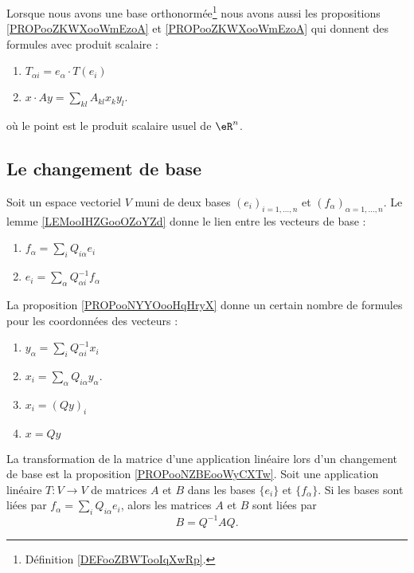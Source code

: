 Lorsque nous avons une base orthonormée\footnote{Définition \ref{DEFooZBWTooIqXwRp}.} nous avons aussi les propositions \ref{PROPooZKWXooWmEzoA} et \ref{PROPooZKWXooWmEzoA} qui donnent des formules avec produit scalaire :
\begin{enumerate}
	\item
	      \( T_{\alpha i}=e_{\alpha}\cdot T(e_i)\)
	\item
	      \( x\cdot Ay=\sum_{kl}A_{kl}x_ky_l\).
\end{enumerate}
où le point est le produit scalaire usuel de \( \eR^n\).

\subsection{Le changement de base}

Soit un espace vectoriel \( V\) muni de deux bases \( (e_i)_{i=1,\ldots, n}\) et \( (f_{\alpha})_{\alpha=1,\ldots, n}\). Le lemme \ref{LEMooIHZGooOZoYZd} donne le lien entre les vecteurs de base :
\begin{enumerate}
	\item
	      \( f_{\alpha}=\sum_iQ_{i\alpha}e_i\)
	\item
	      \( e_i=\sum_{\alpha}Q^{-1}_{\alpha i}f_{\alpha}\)
\end{enumerate}
La proposition \ref{PROPooNYYOooHqHryX} donne un certain nombre de formules pour les coordonnées des vecteurs :
\begin{enumerate}
	\item
	      \( y_{\alpha}=\sum_iQ^{-1}_{\alpha i}x_i\)
	\item
	      \( x_i=\sum_{\alpha}Q_{i\alpha}y_{\alpha}\).
	\item
	      \( x_i=(Qy)_i\)
	\item
	      \( x=Qy\)
\end{enumerate}

La transformation de la matrice d'une application linéaire lors d'un changement de base est la proposition \ref{PROPooNZBEooWyCXTw}. Soit une application linéaire \( T\colon V\to V\) de matrices \( A\) et \( B\) dans les bases \( \{ e_i \}\) et \( \{ f_{\alpha} \}\). Si les bases sont liées par \( f_{\alpha}=\sum_iQ_{i\alpha}e_i\), alors les matrices \( A\) et \( B\) sont liées par
\begin{equation}
	B=Q^{-1}AQ.
\end{equation}

